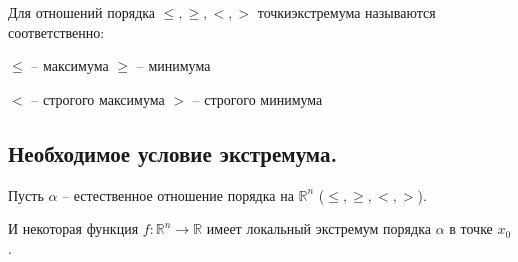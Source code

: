 \begin{definition}
Для отношений порядка $\leq, \geq, <, >$ точки\linebreak экстремума называются соответственно:

$\leq$ -- максимума
$\geq$ -- минимума

$<$ -- строгого максимума
$>$ -- строгого минимума

\end{definition}
\subsection{Необходимое условие экстремума.}
\parindent=0cm
Пусть $\alpha$ -- естественное отношение порядка на $\mathbb{R}^n$ ($\leq, \geq, <, >$).

И некоторая функция $f: \mathbb{R}^n \to \mathbb{R}$ имеет локальный экстремум порядка $\alpha$ в точке $x_0$.

